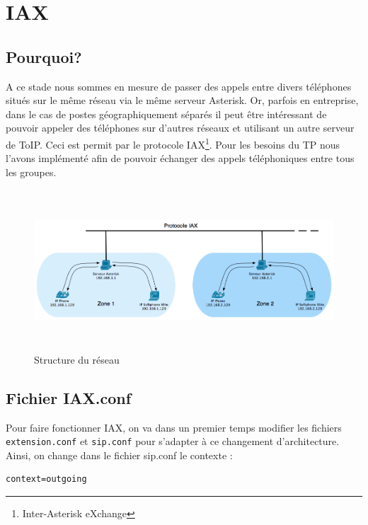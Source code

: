 \documentclass[12pt,a4paper,notitlepage]{article}
\begin{document}
\section{IAX} 
\subsection{Pourquoi?}
A ce stade nous sommes en mesure de passer des appels entre divers téléphones situés sur le même réseau via le même serveur Asterisk. Or, parfois en entreprise, dans le cas de postes géographiquement séparés il peut être intéressant de pouvoir appeler des téléphones sur d'autres réseaux et utilisant un autre serveur de ToIP. Ceci est permit par le protocole IAX\footnote{Inter-Asterisk eXchange}. Pour les besoins du TP nous l'avons implémenté afin de pouvoir échanger des appels téléphoniques entre tous les groupes.

\begin{figure}[!h]
\begin{center}
\includegraphics[height=6cm]{structure_reseau_IAX}
\caption{Structure du réseau}
\label{fig:da}
\end{center}
\end{figure}


\subsection{Fichier IAX.conf}
Pour faire fonctionner IAX, on va dans un premier temps modifier les fichiers \texttt{extension.conf} et \texttt{sip.conf} pour s'adapter à ce changement d'architecture.\\

Ainsi, on change dans le fichier sip.conf le contexte : 

\begin{lstlisting}[title=Ajout au fichier sip.conf pour IAX]
context=outgoing
\end{lstlisting}
\end{document}
